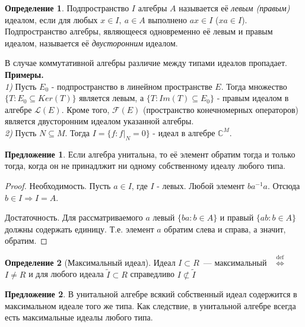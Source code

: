 \documentclass[12pt]{extarticle}
\theoremstyle{definition}
\newtheorem{definition}{\indent Определение}[section]
\newtheorem{suggestion}{\indent Предложение}[section]
\newcommand{\iffdef}{\stackrel{\mathrm{def}}{\iff}}
\begin{document}
        \begin{definition} \label{def: ideal}
        Подпространство $I$ алгебры $A$ называется её \textit{левым (правым)} идеалом, если для любых $x \in I,\ a \in A$ выполнено $ax \in I$ ($xa \in I$). Подпространство алгебры, являющееся одновременно её левым и правым идеалом, называется её \textit{двусторонним} идеалом.
    \end{definition}
    
    В случае коммутативной алгебры различие между типами идеалов пропадает. \\
    
    \textbf{Примеры.} \\
    
    \textit{1)} Пусть $E_0$ - подпространство в линейном пространстве $E$. Тогда множество $\{T : E_0 \subseteq Ker(T)\}$ является левым, а $\{T: Im(T) \subseteq E_0\}$ - правым идеалом в алгебре $\mathcal{L}(E)$. Кроме того, $\mathcal{F}(E)$ (пространство конечномерных операторов) является двусторонним идеалом указанной алгебры. \\
    
    \textit{2)} Пусть $N \subseteq M$. Тогда $I = \{f: f|_N = 0\}$ - идеал в алгебре $\mathds{C}^M$.\\
    
    \begin{suggestion}
    Если алгебра унитальна, то её элемент обратим тогда и только тогда, когда он не принадлжит ни одному собственному идеалу любого типа.
    \end{suggestion}
    \begin{proof}
    Необходимость. Пусть $a \in I$, где $I$ - левых. Любой элемент $ba^{-1}a$. Отсюда $b \in I \Rightarrow I = A$. 
    
    Достаточность. Для рассматриваемого $a$ левый $\{ba: b \in A\}$ и правый $\{ab: b \in A\}$ должны содержать единицу. Т.е. элемент $a$ обратим слева и справа, а значит, обратим. 
    \end{proof}
    
    \begin{definition}[Максимальный идеал]\label{def:Maximal ideal}
        Идеал $I\subset R$~--- максимальный ~$\iffdef$ $I\ne R$ и для любого идеала $\tilde I\subset R$ справедливо $I\nsubset \tilde I$
    \end{definition}
    
   \begin{suggestion}
    В унитальной алгебре всякий собственный идеал содержится в максимальном идеале того же типа. Как следствие, в унитальной алгебре всегда есть максимальные идеалы любого типа.
    \end{suggestion}
    
\end{document}
